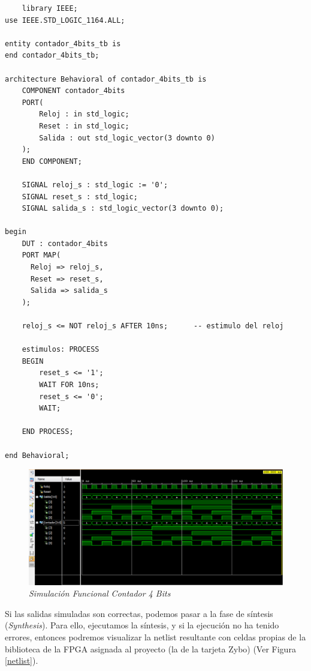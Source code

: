 \begin{lstlisting}
    library IEEE;
use IEEE.STD_LOGIC_1164.ALL;

entity contador_4bits_tb is
end contador_4bits_tb;

architecture Behavioral of contador_4bits_tb is
    COMPONENT contador_4bits 
    PORT(
        Reloj : in std_logic;
        Reset : in std_logic;
        Salida : out std_logic_vector(3 downto 0)
    );
    END COMPONENT;
    
    SIGNAL reloj_s : std_logic := '0';
    SIGNAL reset_s : std_logic;
    SIGNAL salida_s : std_logic_vector(3 downto 0);
       
begin
    DUT : contador_4bits 
    PORT MAP(
      Reloj => reloj_s,
      Reset => reset_s,
      Salida => salida_s  
    );
    
    reloj_s <= NOT reloj_s AFTER 10ns;      -- estimulo del reloj
    
    estimulos: PROCESS
    BEGIN
        reset_s <= '1';
        WAIT FOR 10ns;
        reset_s <= '0';
        WAIT;
        
    END PROCESS;
    
end Behavioral;
\end{lstlisting}

\begin{figure}[H]
    \centering
    \includegraphics[width = 1\textwidth]{imagenes/contador4bits.png}
    \caption{\textit{Simulación Funcional Contador 4 Bits}}\label{contador}
\end{figure}

Si las salidas simuladas son correctas, podemos pasar a la fase de síntesis (\textit{Synthesis}). Para ello, ejecutamos la síntesis, 
y si la ejecución no ha tenido errores, entonces podremos visualizar la netlist resultante con celdas propias de la biblioteca de la 
FPGA asignada al proyecto (la de la tarjeta Zybo) (Ver Figura \ref{netlist}).


